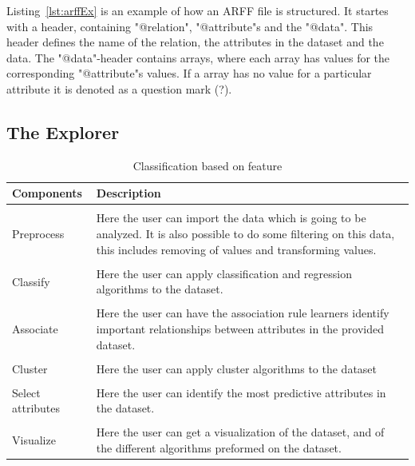 Listing~\ref{lst:arffEx} is an example of how an ARFF file is structured. It startes with a header, containing "@relation", "@attribute"s and the "@data". This header defines the name of the relation, the attributes in the dataset and the data. The "@data"-header contains arrays, where each array has values for the corresponding "@attribute"s values. If a array has no value for a particular attribute it is denoted as a question mark (?).

\subsection{The Explorer}
\begin{table}[H]
\centering
\begin{tabularx}{1.0\textwidth}{ l p{9.3cm} }
  \textbf{Components} & \textbf{Description} \\
  \hline \\ [-1.5ex]
  Preprocess & Here the user can import the data which is going to be analyzed. It is also possible to do some filtering on this data, this includes removing of values and transforming values. \\
  \hline \\ [-1.5ex]
  Classify & Here the user can apply classification and regression algorithms to the dataset. \\
  \hline \\ [-1.5ex]
  Associate & Here the user can have the association rule learners identify important relationships between attributes in the provided dataset. \\
  \hline \\ [-1.5ex]
  Cluster & Here the user can apply cluster algorithms to the dataset \\
  \hline \\ [-1.5ex]
  Select attributes & Here the user can identify the most predictive attributes in the dataset. \\
  \hline \\ [-1.5ex]
  Visualize & Here the user can get a visualization of the dataset, and of the different algorithms preformed on the dataset. \\
\end{tabularx}
\caption{Classification based on feature}
\label{table:nosql-calssifications}
\end{table}


